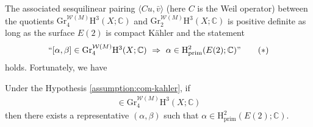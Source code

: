The associated
sesquilinear pairing \(\langle Cu,\bar{v}\rangle\) 
(here \(C\) is the Weil operator) 
between the quotients \(\mathrm{Gr}_{4}^{\mathcal{W}(M)}\mathrm{H}^{3}(X;\mathbb{C})\)
and \(\mathrm{Gr}_{2}^{\mathcal{W}(M)}\mathrm{H}^{3}(X;\mathbb{C})\)
is positive definite as
long as the surface \(E(2)\) is compact K\"{a}hler and the statement
\begin{equation}
\label{eq:implication}
``\mbox{\([\alpha,\beta]\in\mathrm{Gr}_{4}^{\mathcal{W}(M)}\mathrm{H}^{3}(X;\mathbb{C})
\)}~\Rightarrow~\alpha\in \mathrm{H}^{2}_{\mathrm{prim}}(E(2);\mathbb{C})"
\tag{\(\ast\)}
\end{equation}
holds. Fortunately, we have

\begin{proposition}
Under the Hypothesis \ref{assumption:com-kahler}, if 
\begin{eqnarray*}
[\alpha,\beta]\in\mathrm{Gr}_{4}^{\mathcal{W}(M)}\mathrm{H}^{3}(X;\mathbb{C})
\end{eqnarray*}
then there exists a representative \((\alpha,\beta)\)
such that \(\alpha\in \mathrm{H}^{2}_{\mathrm{prim}}(E(2);\mathbb{C})\).
\end{proposition}
